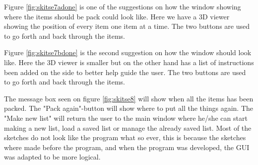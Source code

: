 
Figure \ref{fig:skitse7adone} is one of the suggestions on how the window showing where the items should be pack could look like. Here we have a 3D viewer showing the position of every item one item at a time. The two buttons are used to go forth and back through the items.


Figure \ref{fig:skitse7bdone} is the second suggestion on how the window should look like. Here the 3D viewer is smaller but on the other hand has a list of instructions been added on the side to better help guide the user. The two buttons are used to go forth and back through the items.


The message box seen on figure \ref{fig:skitse8} will show when all the items has been packed. The "Pack again"-button will show where to put all the things again. The "Make new list" will return the user to the main window where he/she can start making a new list, load a saved list or manage the already saved list. Most of the sketches do not look like the program what so ever, this is because the sketches where made before the program, and when the program was developed, the GUI was adapted to be more logical.
